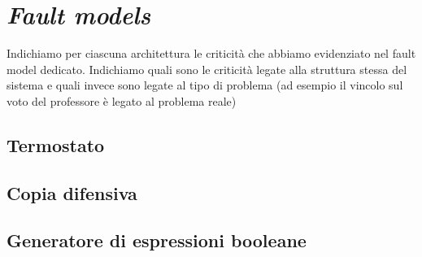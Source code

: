 \section{\emph{Fault models}}

Indichiamo per ciascuna architettura le criticità che abbiamo evidenziato nel fault model dedicato. Indichiamo quali sono le criticità legate alla struttura stessa del sistema e quali invece sono legate al tipo di problema (ad esempio il vincolo sul voto del professore è legato al problema reale)

\subsection{Termostato}

\subsection{Copia difensiva}

\subsection{Generatore di espressioni booleane}